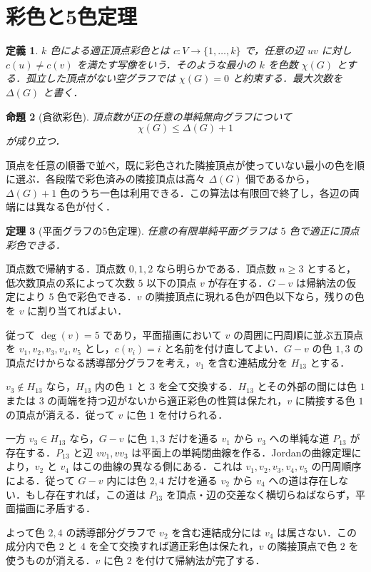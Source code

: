 \documentclass[a5paper,10pt,onecolumn]{jsarticle}
\makeatletter
\theoremstyle{mathnotetheorem}
\newtheorem{theorem}{定理}[section]
\newtheorem{definition}[theorem]{定義}
\newtheorem{proposition}[theorem]{命題}
\renewcommand{\proofname}{証明}
\renewenvironment{proof}[1][\proofname]{%
  \par\pushQED{\qed}\normalfont\topsep4\p@\@plus2\p@\relax
  \trivlist\item[\hskip\labelsep\bfseries #1]\ignorespaces
}{\popQED\endtrivlist\@endpefalse}
\makeatother
\begin{document}
\section{彩色と5色定理}
\begin{definition}
$k$ 色による適正頂点彩色とは $c:V\to\{1,\dots,k\}$ で，任意の辺 $uv$ に対し $c(u)\ne c(v)$ を満たす写像をいう．そのような最小の $k$ を色数 $\chi(G)$ とする．孤立した頂点がない空グラフでは $\chi(G)=0$ と約束する．最大次数を $\Delta(G)$ と書く．
\end{definition}
\begin{proposition}[貪欲彩色]
頂点数が正の任意の単純無向グラフについて
\[
 \chi(G)\le\Delta(G)+1
\]
が成り立つ．
\end{proposition}
\begin{proof}
頂点を任意の順番で並べ，既に彩色された隣接頂点が使っていない最小の色を順に選ぶ．各段階で彩色済みの隣接頂点は高々 $\Delta(G)$ 個であるから，$\Delta(G)+1$ 色のうち一色は利用できる．この算法は有限回で終了し，各辺の両端には異なる色が付く．
\end{proof}
\begin{theorem}[平面グラフの5色定理]\label{thm:five-color}
任意の有限単純平面グラフは $5$ 色で適正に頂点彩色できる．
\end{theorem}
\begin{proof}
頂点数で帰納する．頂点数 $0,1,2$ なら明らかである．頂点数 $n\ge3$ とすると，低次数頂点の系によって次数 $5$ 以下の頂点 $v$ が存在する．$G-v$ は帰納法の仮定により $5$ 色で彩色できる．$v$ の隣接頂点に現れる色が四色以下なら，残りの色を $v$ に割り当てればよい．

従って $\deg(v)=5$ であり，平面描画において $v$ の周囲に円周順に並ぶ五頂点を $v_1,v_2,v_3,v_4,v_5$ とし，$c(v_i)=i$ と名前を付け直してよい．$G-v$ の色 $1,3$ の頂点だけからなる誘導部分グラフを考え，$v_1$ を含む連結成分を $H_{13}$ とする．

$v_3\notin H_{13}$ なら，$H_{13}$ 内の色 $1$ と $3$ を全て交換する．$H_{13}$ とその外部の間には色 $1$ または $3$ の両端を持つ辺がないから適正彩色の性質は保たれ，$v$ に隣接する色 $1$ の頂点が消える．従って $v$ に色 $1$ を付けられる．

一方 $v_3\in H_{13}$ なら，$G-v$ に色 $1,3$ だけを通る $v_1$ から $v_3$ への単純な道 $P_{13}$ が存在する．$P_{13}$ と辺 $vv_1,vv_3$ は平面上の単純閉曲線を作る．Jordanの曲線定理により，$v_2$ と $v_4$ はこの曲線の異なる側にある．これは $v_1,v_2,v_3,v_4,v_5$ の円周順序による．従って $G-v$ 内には色 $2,4$ だけを通る $v_2$ から $v_4$ への道は存在しない．もし存在すれば，この道は $P_{13}$ を頂点・辺の交差なく横切らねばならず，平面描画に矛盾する．

よって色 $2,4$ の誘導部分グラフで $v_2$ を含む連結成分には $v_4$ は属さない．この成分内で色 $2$ と $4$ を全て交換すれば適正彩色は保たれ，$v$ の隣接頂点で色 $2$ を使うものが消える．$v$ に色 $2$ を付けて帰納法が完了する．
\end{proof}
\end{document}
